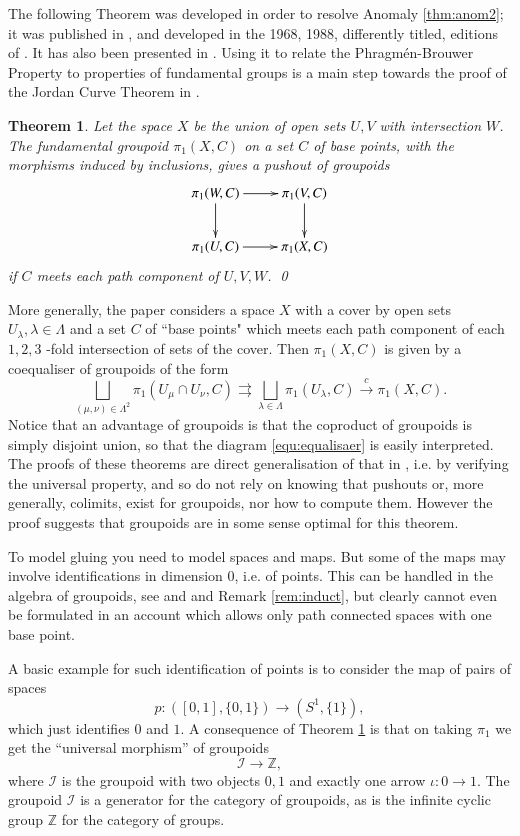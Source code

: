 \documentclass{elsarticle}
\newtheorem{theorem}[example]{Theorem}
{\theorembodyfont{\rmfamily}\newtheorem{rem}[example]{Remark}}
\begin{document}
The following  Theorem was developed in order to resolve Anomaly \ref{thm:anom2}; it was published in \cite{B67}, and developed in the 1968, 1988, differently
titled, editions of \cite{B2006}.  It has also been presented in \cite{H71,Zi}.  Using it to relate  the Phragm\'en-Brouwer Property  to properties of fundamental groups  is a main step towards the proof  of the Jordan Curve Theorem in  \cite{B2006,Acb15}.
\begin{theorem} \label{thm:vktgpd} Let the space $X$ be the union of open sets $U,V$ with intersection $W$.
 The fundamental groupoid $\pi_1(X,C)$ on a set $C$ of base points, with the morphisms induced by inclusions,   gives a pushout of groupoids
 $$\xymatrix{\pi_1(W,C) \ar[d] \ar [r] & \pi_1(V,C) \ar [d]\\
 \pi_1(U,C) \ar [r] & \pi_1(X,C)}$$
 if $C$ meets each path component of $U,V,W$. \qed
\end{theorem}
More generally, the paper \cite{BRa84} considers a space $X$ with a cover by open sets $U_\lambda, \lambda \in \Lambda$ and a set $C$  of
``base points" which meets each path component of each $1, 2, 3$ -fold intersection of sets of the
cover. Then $ \pi_1(X,C)$  is given by a coequaliser of groupoids of the form
\begin{equation}\label{equ:equalisaer} \bigsqcup _{(\mu,\nu) \in \Lambda^2} \pi_1(U_\mu \cap U_\nu,C) \rightrightarrows \bigsqcup_{\lambda \in \Lambda} \pi_1(U_\lambda,C) \xrightarrow{c} \pi_1(X,C).   \end{equation}
Notice that an advantage of groupoids is that the coproduct of groupoids is simply disjoint union, so that the diagram \eqref{equ:equalisaer} is easily interpreted.
 The proofs of these theorems are direct generalisation of that in \cite{Cr59}, i.e. by verifying
the universal property, and so do not rely on knowing that pushouts or, more generally, colimits,  exist for groupoids, nor how to compute them. However the proof suggests that  groupoids are in some sense optimal for this theorem.

To model gluing you need to model spaces and maps.  But some of the maps may involve
identifications in dimension $0$, i.e. of points. This can be handled in the algebra of groupoids,
see \cite{H71} and \cite[Section 9.1]{B2006} and Remark \ref{rem:induct}, but clearly cannot even be formulated in an account which allows only path
connected spaces with one base point.

A basic example for such identification of points is to consider the map of pairs of spaces
$$ p: ([0,1],\{0,1\}) \to (S^1, \{1\}), $$
which just identifies $0$  and $1$. A consequence of Theorem \ref{thm:vktgpd} is that on taking $\pi_1$ we get the ``universal morphism'' of groupoids
$$\mathcal I\to \mathbb Z,$$ where $\mathcal I$  is the groupoid with two objects $0,1$  and exactly one arrow
$\iota : 0 \to 1$. The groupoid $\mathcal I$ is a generator for the category of groupoids, as is the infinite cyclic group $\mathbb Z $ for the category of
groups.
\end{document}
